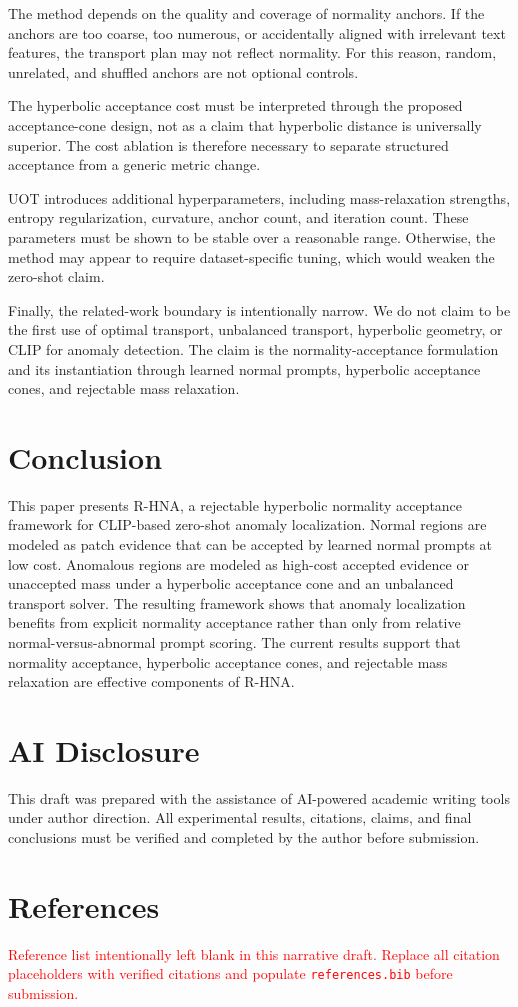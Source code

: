\documentclass[10pt]{article}
\newcommand{\method}{R-HNA}
\begin{document}
The method depends on the quality and coverage of normality anchors.
If the anchors are too coarse, too numerous, or accidentally aligned with irrelevant text features, the transport plan may not reflect normality.
For this reason, random, unrelated, and shuffled anchors are not optional controls.

The hyperbolic acceptance cost must be interpreted through the proposed acceptance-cone design, not as a claim that hyperbolic distance is universally superior.
The cost ablation is therefore necessary to separate structured acceptance from a generic metric change.

UOT introduces additional hyperparameters, including mass-relaxation strengths, entropy regularization, curvature, anchor count, and iteration count.
These parameters must be shown to be stable over a reasonable range.
Otherwise, the method may appear to require dataset-specific tuning, which would weaken the zero-shot claim.

Finally, the related-work boundary is intentionally narrow.
We do not claim to be the first use of optimal transport, unbalanced transport, hyperbolic geometry, or CLIP for anomaly detection.
The claim is the normality-acceptance formulation and its instantiation through learned normal prompts, hyperbolic acceptance cones, and rejectable mass relaxation.

\section{Conclusion}

This paper presents \method{}, a rejectable hyperbolic normality acceptance framework for CLIP-based zero-shot anomaly localization.
Normal regions are modeled as patch evidence that can be accepted by learned normal prompts at low cost.
Anomalous regions are modeled as high-cost accepted evidence or unaccepted mass under a hyperbolic acceptance cone and an unbalanced transport solver.
The resulting framework shows that anomaly localization benefits from explicit normality acceptance rather than only from relative normal-versus-abnormal prompt scoring.
The current results support that normality acceptance, hyperbolic acceptance cones, and rejectable mass relaxation are effective components of \method{}.

\section*{AI Disclosure}
This draft was prepared with the assistance of AI-powered academic writing tools under author direction.
All experimental results, citations, claims, and final conclusions must be verified and completed by the author before submission.

\section*{References}
\textcolor{red}{Reference list intentionally left blank in this narrative draft. Replace all citation placeholders with verified citations and populate \texttt{references.bib} before submission.}
\end{document}
